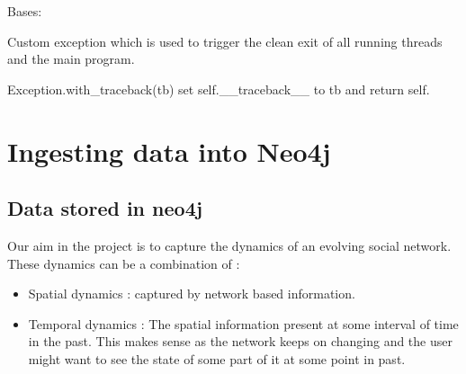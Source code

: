 \documentclass[letterpaper,10pt,english]{sphinxmanual}
\begin{document}
\begin{fulllineitems}
\label{\detokenize{kafka:kafka_tweets_producer.ServiceExit}}
Bases: 

Custom exception which is used to trigger the clean exit
of all running threads and the main program.

\begin{fulllineitems}
\label{\detokenize{kafka:kafka_tweets_producer.ServiceExit.args}}
\end{fulllineitems}


\begin{fulllineitems}
\label{\detokenize{kafka:kafka_tweets_producer.ServiceExit.with_traceback}}
Exception.with\_traceback(tb) \textendash{}
set self.\_\_traceback\_\_ to tb and return self.

\end{fulllineitems}


\end{fulllineitems}


\begin{fulllineitems}
\label{\detokenize{kafka:kafka_tweets_producer.service_shutdown}}
\end{fulllineitems}



\chapter{Ingesting data into Neo4j}
\label{\detokenize{neo4j_data_ingestion:ingesting-data-into-neo4j}}\label{\detokenize{neo4j_data_ingestion::doc}}

\section{Data stored in neo4j}
\label{\detokenize{neo4j_data_ingestion:data-stored-in-neo4j}}
Our aim in the project is to capture the dynamics of an evolving social network. These dynamics can be a combination of :
\begin{itemize}
\item {} 
Spatial dynamics : captured by network based information.

\item {} 
Temporal dynamics : The spatial information present at some interval of time in the past. This makes sense as the network keeps on changing and the user might want to see the state of some part of it at some point in past.

\end{itemize}
\end{document}
